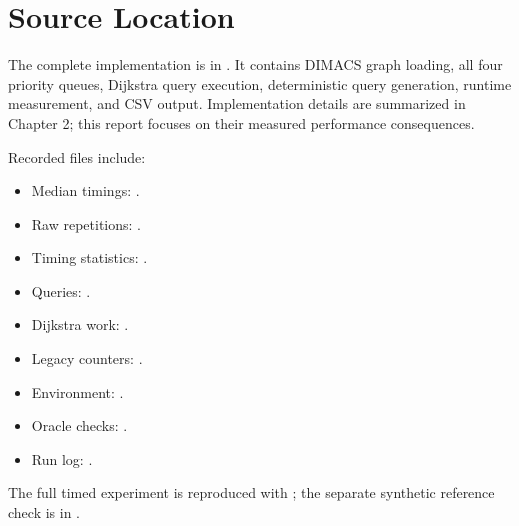 \documentclass[12pt,a4paper]{report}
\newcommand{\code}[1]{\texttt{\detokenize{#1}}}
\begin{document}
\appendix
\chapter{Source Location}
The complete implementation is in \code{src/1.c}.
It contains DIMACS graph loading, all four priority queues, Dijkstra query
execution, deterministic query generation, runtime measurement, and CSV
output. Implementation details are summarized in Chapter 2; this report
focuses on their measured performance consequences.

Recorded files include:
\begin{itemize}
  \item Median timings: .
  \item Raw repetitions: .
  \item Timing statistics: .
  \item Queries: .
  \item Dijkstra work: .
  \item Legacy counters: .
  \item Environment: .
  \item Oracle checks: .
  \item Run log: .
\end{itemize}
The full timed experiment is reproduced with
; the separate synthetic reference check
is in .
\end{document}
